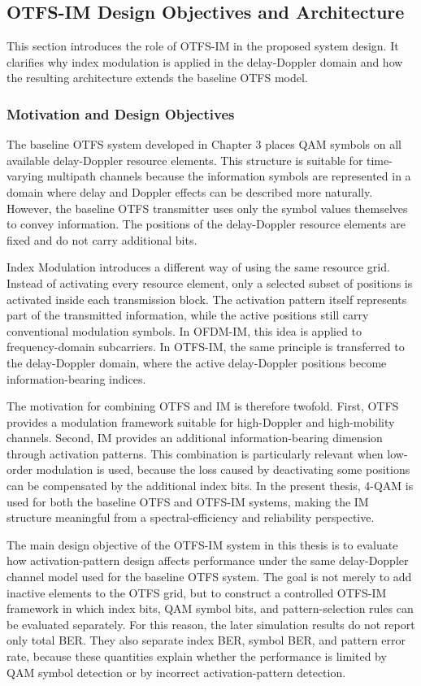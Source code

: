 \subsection{OTFS-IM Design Objectives and Architecture}

This section introduces the role of OTFS-IM in the proposed system design. It clarifies why index modulation is applied in the delay-Doppler domain and how the resulting architecture extends the baseline OTFS model.

\subsubsection{Motivation and Design Objectives}

The baseline OTFS system developed in Chapter 3 places QAM symbols on all available delay-Doppler resource elements. This structure is suitable for time-varying multipath channels because the information symbols are represented in a domain where delay and Doppler effects can be described more naturally. However, the baseline OTFS transmitter uses only the symbol values themselves to convey information. The positions of the delay-Doppler resource elements are fixed and do not carry additional bits.

Index Modulation introduces a different way of using the same resource grid. Instead of activating every resource element, only a selected subset of positions is activated inside each transmission block. The activation pattern itself represents part of the transmitted information, while the active positions still carry conventional modulation symbols. In OFDM-IM, this idea is applied to frequency-domain subcarriers. In OTFS-IM, the same principle is transferred to the delay-Doppler domain, where the active delay-Doppler positions become information-bearing indices.

The motivation for combining OTFS and IM is therefore twofold. First, OTFS provides a modulation framework suitable for high-Doppler and high-mobility channels. Second, IM provides an additional information-bearing dimension through activation patterns. This combination is particularly relevant when low-order modulation is used, because the loss caused by deactivating some positions can be compensated by the additional index bits. In the present thesis, 4-QAM is used for both the baseline OTFS and OTFS-IM systems, making the IM structure meaningful from a spectral-efficiency and reliability perspective.

The main design objective of the OTFS-IM system in this thesis is to evaluate how activation-pattern design affects performance under the same delay-Doppler channel model used for the baseline OTFS system. The goal is not merely to add inactive elements to the OTFS grid, but to construct a controlled OTFS-IM framework in which index bits, QAM symbol bits, and pattern-selection rules can be evaluated separately. For this reason, the later simulation results do not report only total BER. They also separate index BER, symbol BER, and pattern error rate, because these quantities explain whether the performance is limited by QAM symbol detection or by incorrect activation-pattern detection.

